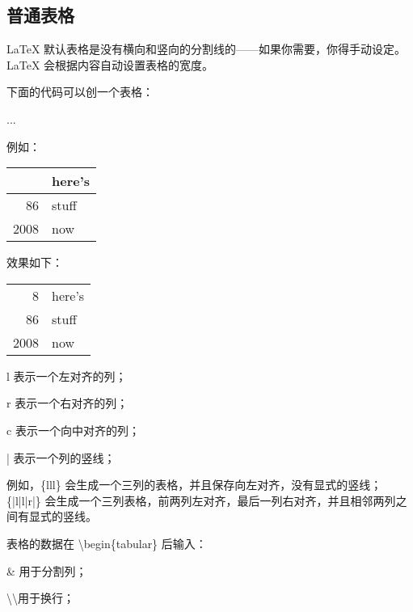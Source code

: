 \subsection{普通表格}

LaTeX 默认表格是没有横向和竖向的分割线的——如果你需要，你得手动设定。LaTeX 会根据内容自动设置表格的宽度。

下面的代码可以创一个表格：

\begin{python}
\begin{tabular}{...}
\end{tabular}
\end{python}
	
例如：

\begin{python}
\begin{center}
\begin{tabular}{|r|l|}
	\centering
	\hline
	8              & here's \\
	\cline 86 & stuff  \\
	\hline
	\hline
	2008           & now    \\
	\hline
\end{tabular}
\end{center}
\end{python}

效果如下：

\begin{center}
\begin{tabular}{|r|l|}
	\hline
	8              & here's \\
	\cline{2-2}
	86 & stuff  \\
	\hline
	2008           & now    \\
	\hline
\end{tabular}
\end{center}

l 表示一个左对齐的列；

r 表示一个右对齐的列；

c 表示一个向中对齐的列；

| 表示一个列的竖线；

例如，\{lll\} 会生成一个三列的表格，并且保存向左对齐，没有显式的竖线；\{|l|l|r|\} 会生成一个三列表格，前两列左对齐，最后一列右对齐，并且相邻两列之间有显式的竖线。

表格的数据在 \textbackslash begin\{tabular\} 后输入：

\& 用于分割列；

\textbackslash \textbackslash 用于换行；

